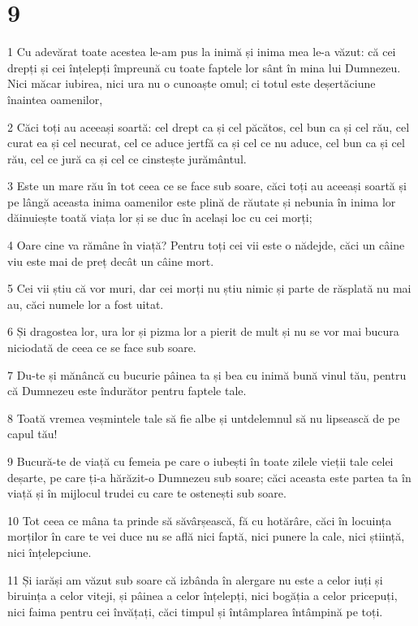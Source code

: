 \chapter{9}

\par 1 Cu adevărat toate acestea le-am pus la inimă și inima mea le-a văzut: că cei drepți și cei înțelepți împreună cu toate faptele lor sânt în mina lui Dumnezeu. Nici măcar iubirea, nici ura nu o cunoaște omul; ci totul este deșertăciune înaintea oamenilor,
\par 2 Căci toți au aceeași soartă: cel drept ca și cel păcătos, cel bun ca și cel rău, cel curat ea și cel necurat, cel ce aduce jertfă ca și cel ce nu aduce, cel bun ca și cel rău, cel ce jură ca și cel ce cinstește jurământul.
\par 3 Este un mare rău în tot ceea ce se face sub soare, căci toți au aceeași soartă și pe lângă aceasta inima oamenilor este plină de răutate și nebunia în inima lor dăinuiește toată viața lor și se duc în același loc cu cei morți;
\par 4 Oare cine va rămâne în viață? Pentru toți cei vii este o nădejde, căci un câine viu este mai de preț decât un câine mort.
\par 5 Cei vii știu că vor muri, dar cei morți nu știu nimic și parte de răsplată nu mai au, căci numele lor a fost uitat.
\par 6 Și dragostea lor, ura lor și pizma lor a pierit de mult și nu se vor mai bucura niciodată de ceea ce se face sub soare.
\par 7 Du-te și mănâncă cu bucurie pâinea ta și bea cu inimă bună vinul tău, pentru că Dumnezeu este îndurător pentru faptele tale.
\par 8 Toată vremea veșmintele tale să fie albe și untdelemnul să nu lipsească de pe capul tău!
\par 9 Bucură-te de viață cu femeia pe care o iubești în toate zilele vieții tale celei deșarte, pe care ți-a hărăzit-o Dumnezeu sub soare; căci aceasta este partea ta în viață și în mijlocul trudei cu care te ostenești sub soare.
\par 10 Tot ceea ce mâna ta prinde să săvârșească, fă cu hotărâre, căci în locuința morților în care te vei duce nu se află nici faptă, nici punere la cale, nici știință, nici înțelepciune.
\par 11 Și iarăși am văzut sub soare că izbânda în alergare nu este a celor iuți și biruința a celor viteji, și pâinea a celor înțelepți, nici bogăția a celor pricepuți, nici faima pentru cei învățați, căci timpul și întâmplarea întâmpină pe toți.
